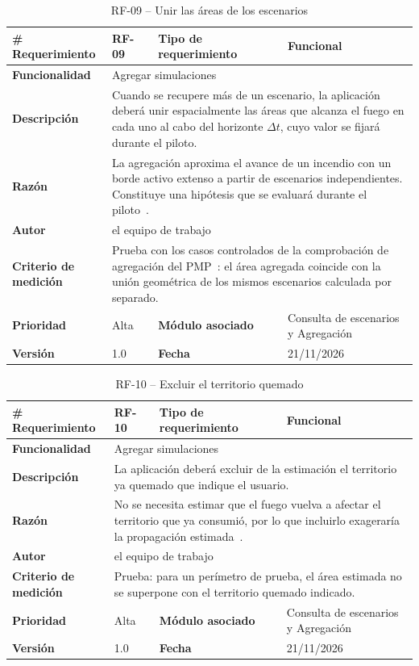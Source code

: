 \begin{longtable}{|p{\rqA}|p{\rqB}|p{\rqC}|p{\rqD}|}
  \caption{RF-09 -- Unir las áreas de los escenarios}\label{tab:rf-09}\tabularnewline
  \hline
  \textbf{\# Requerimiento} & RF-09 & \raggedright\textbf{Tipo de requerimiento} & Funcional\tabularnewline\hline
  \raggedright\textbf{Funcionalidad} & \multicolumn{3}{p{\rqBCD}|}{Agregar simulaciones}\tabularnewline\hline
  \endfirsthead
  \textbf{Descripción} & \multicolumn{3}{p{\rqBCD}|}{Cuando se recupere más de un escenario, la aplicación deberá unir espacialmente las áreas que alcanza el fuego en cada uno al cabo del horizonte $\Delta t$, cuyo valor se fijará durante el piloto.}\tabularnewline\hline
  \textbf{Razón} & \multicolumn{3}{p{\rqBCD}|}{La agregación aproxima el avance de un incendio con un borde activo extenso a partir de escenarios independientes. Constituye una hipótesis que se evaluará durante el piloto~\cite{vfp2026}.}\tabularnewline\hline
  \textbf{Autor} & \multicolumn{3}{p{\rqBCD}|}{el equipo de trabajo}\tabularnewline\hline
  \raggedright\textbf{Criterio de medición} & \multicolumn{3}{p{\rqBCD}|}{Prueba con los casos controlados de la comprobación de agregación del PMP~\cite{pmp2026}: el área agregada coincide con la unión geométrica de los mismos escenarios calculada por separado.}\tabularnewline\hline
  \textbf{Prioridad} & Alta & \raggedright\textbf{Módulo asociado} & Consulta de escenarios y Agregación\tabularnewline\hline
  \textbf{Versión} & 1.0 & \textbf{Fecha} & 21/11/2026\tabularnewline\hline
\end{longtable}

\begin{longtable}{|p{\rqA}|p{\rqB}|p{\rqC}|p{\rqD}|}
  \caption{RF-10 -- Excluir el territorio quemado}\label{tab:rf-10}\tabularnewline
  \hline
  \textbf{\# Requerimiento} & RF-10 & \raggedright\textbf{Tipo de requerimiento} & Funcional\tabularnewline\hline
  \raggedright\textbf{Funcionalidad} & \multicolumn{3}{p{\rqBCD}|}{Agregar simulaciones}\tabularnewline\hline
  \endfirsthead
  \textbf{Descripción} & \multicolumn{3}{p{\rqBCD}|}{La aplicación deberá excluir de la estimación el territorio ya quemado que indique el usuario.}\tabularnewline\hline
  \textbf{Razón} & \multicolumn{3}{p{\rqBCD}|}{No se necesita estimar que el fuego vuelva a afectar el territorio que ya consumió, por lo que incluirlo exageraría la propagación estimada~\cite{vfp2026}.}\tabularnewline\hline
  \textbf{Autor} & \multicolumn{3}{p{\rqBCD}|}{el equipo de trabajo}\tabularnewline\hline
  \raggedright\textbf{Criterio de medición} & \multicolumn{3}{p{\rqBCD}|}{Prueba: para un perímetro de prueba, el área estimada no se superpone con el territorio quemado indicado.}\tabularnewline\hline
  \textbf{Prioridad} & Alta & \raggedright\textbf{Módulo asociado} & Consulta de escenarios y Agregación\tabularnewline\hline
  \textbf{Versión} & 1.0 & \textbf{Fecha} & 21/11/2026\tabularnewline\hline
\end{longtable}

